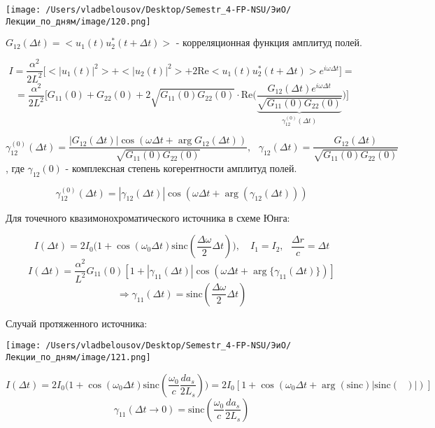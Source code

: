 \documentclass[12pt, a4paper]{report}
\begin{document}
\begin{center}
    \texttt{[image: /Users/vladbelousov/Desktop/Semestr\_4-FP-NSU/ЭиО/Лекции\_по\_дням/image/120.png]}
\end{center}  

\[ G_{12} (\Delta t ) = <u_1 (t ) u_2 ^* (t + \Delta t )> \text{ - корреляционная функция амплитуд полей.} \] 

\[ I = \frac{\alpha ^2 }{ 2 L ^2 } \bigg[  <|u_1 (t )| ^2 >+ <|u_2 (t)| ^2 >+ 2 \mathrm{Re }  {<u_1 (t ) u_2 ^* (t + \Delta t )>e ^{ i \omega \Delta t } }  \bigg]  = \] 
\[ = \frac{\alpha ^2 }{2 L ^2 } \bigg[ G_{11} ( 0 ) + G_{22} (0 ) + 2 \sqrt{G_{11} (0 ) G_{22} (0 )} \cdot \mathrm{Re }  \bigg( \frac{G_{12 } (\Delta t ) e^{ i \omega \Delta t }}{\underbrace{\sqrt{G_{11}(0 ) G_{22}(0 )}}_{\gamma_{12} ^{(0 )}  ( \Delta t )}}   \bigg)  \bigg]  \] 

\[ \gamma_{12} ^{(0 )}  (\Delta t ) = \frac{ |G_{12} (\Delta t ) | \cos ( \omega \Delta t + \arg  G_{12} (\Delta t ))}{ \sqrt{G_{11} (0 ) G_{22}(0)}}  , \text{ }  \gamma_{12} (\Delta t ) = \frac{ G_{12} (\Delta t )}{\sqrt{G_{11}(0 ) G_{22}(0 ) }} \]
, где \( \gamma_{12} (0 ) \) - комплексная степень когерентности амплитуд полей. 

\[ \gamma_{12}^{(0)}(\Delta t ) = |\gamma_{12} (\Delta t )| \cos (\omega \Delta t + \arg (\gamma_{12} (\Delta t ))) \] 

Для точечного квазимонохроматического источника в схеме Юнга: 

\[ I(\Delta t ) = 2 I_0     \bigg(1+ \cos (\omega_0 \Delta t ) \mathrm{ sinc } \left( \frac{\Delta \omega }{2 } \Delta t   \right) \bigg ) , \quad  I_1 = I_2 , \text{ }  \frac{\Delta r }{c } = \Delta t   \] 
\[ I(\Delta t ) = \frac{\alpha ^2 }{L ^2 } G_{11}(0 ) [1 + |\gamma_{11}(\Delta t) |\cos (\omega \Delta t + \arg \{\gamma_{11} (\Delta t)\})]  \] 
\[ \Rightarrow \gamma_{11} (\Delta t ) = \mathrm{sinc }  \left( \frac{\Delta \omega }{2 } \Delta t   \right)  \] 

Случай протяженного источника: 

\begin{center}
    \texttt{[image: /Users/vladbelousov/Desktop/Semestr\_4-FP-NSU/ЭиО/Лекции\_по\_дням/image/121.png]}
\end{center}  

\[ I( \Delta t )  = 2 I_0 \bigg(1 + \cos (\omega_0 \Delta t ) \mathrm{sinc }  \left( \frac{\omega_0 }{c } \frac{ d a_s }{2 L_s}   \right) \bigg) = 2 I_0 [1 + \cos (\omega_0 \Delta t + \arg (\mathrm{sinc }  )|\mathrm{sinc } (\text{ } ) |)] \] 
\[ \gamma_{11}(\Delta t \to  0 ) = \mathrm{sinc }  \left(  \frac{\omega_0 }{c } \frac{d a_s }{2 L_s}   \right)  \] 
\end{document}
